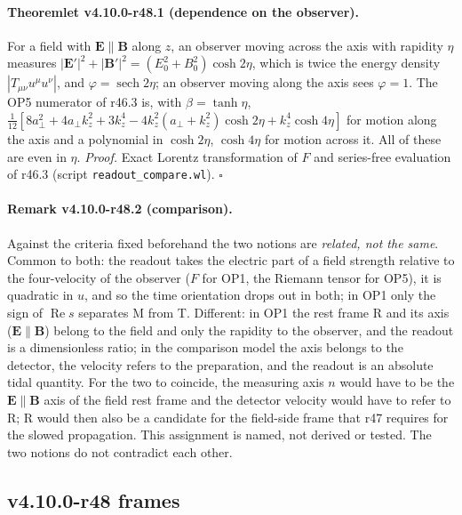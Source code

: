 \paragraph{Theoremlet v4.10.0-r48.1 (dependence on the observer).}
For a field with \(\mathbf E\parallel\mathbf B\) along \(z\), an observer moving across the axis with rapidity \(\eta\) measures \(|\mathbf E'|^2+|\mathbf B'|^2=(E_0^2+B_0^2)\cosh2\eta\), which is twice
the energy density \(|T_{\mu\nu}u^\mu u^\nu|\), and \(\varphi=\operatorname{sech}2\eta\); an observer moving along the axis sees \(\varphi=1\).  The OP5 numerator of r46.3 is, with \(\beta=\tanh\eta\),
\(\tfrac1{12}[8a_\perp^2+4a_\perp k_z^2+3k_z^4-4k_z^2(a_\perp+k_z^2)\cosh2\eta+k_z^4\cosh4\eta]\) for motion along the axis and a polynomial in \(\cosh2\eta\), \(\cosh4\eta\) for motion
across it.  All of these are even in \(\eta\).
\emph{Proof.} Exact Lorentz transformation of \(F\) and series-free evaluation of r46.3 (script \texttt{readout\_\allowbreak compare.wl}).  \(\square\)

\paragraph{Remark v4.10.0-r48.2 (comparison).}
Against the criteria fixed beforehand the two notions are \emph{related, not the same}.  Common to both: the readout takes the electric part of a
field strength relative to the four-velocity of the observer (\(F\) for OP1, the Riemann tensor for OP5), it is quadratic in \(u\), and so the time
orientation drops out in both; in OP1 only the sign of \(\operatorname{Re}s\) separates M from T.  Different: in OP1 the rest frame R and its axis
(\(\mathbf E\parallel\mathbf B\)) belong to the field and only the rapidity to the observer, and the readout is a dimensionless ratio; in the comparison model the axis
belongs to the detector, the velocity refers to the preparation, and the readout is an absolute tidal quantity.  For the two to coincide, the
measuring axis \(n\) would have to be the \(\mathbf E\parallel\mathbf B\) axis of the field rest frame and the detector velocity would have to refer to R; R would then also be a
candidate for the field-side frame that r47 requires for the slowed propagation.  This assignment is named, not derived or tested.  The two
notions do not contradict each other.

\subsection*{v4.10.0-r48 frames}
\label{subsec:v4100-r48-frames}


